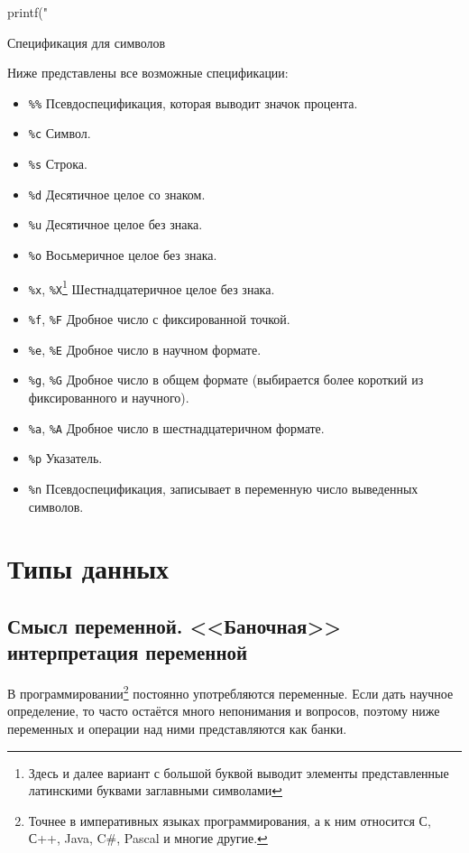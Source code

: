 \documentclass[12pt]{article}
\begin{document}
\begin{listing}[H]
\begin{center}
\begin{ccode}
printf("%
\end{ccode}
\end{center}
\caption{Спецификация для символов}
\label{lst:charspec}
\end{listing}

Ниже представлены все возможные спецификации:
\begin{itemize}
 \item \verb|%%| Псевдоспецификация, которая выводит значок процента.
 \item \verb|%c| Символ.
 \item \verb|%s| Строка.
 \item \verb|%d| Десятичное целое со знаком.
 \item \verb|%u| Десятичное целое без знака.
 \item \verb|%o| Восьмеричное целое без знака.
 \item \verb|%x|, \verb|%X|\footnote{Здесь и далее вариант с большой буквой выводит элементы представленные латинскими буквами заглавными символами} Шестнадцатеричное целое без знака.
 \item \verb|%f|, \verb|%F| Дробное число с фиксированной точкой.
 \item \verb|%e|, \verb|%E| Дробное число в научном формате.
 \item \verb|%g|, \verb|%G| Дробное число в общем формате (выбирается более короткий из фиксированного и научного).
 \item \verb|%a|, \verb|%A| Дробное число в шестнадцатеричном формате.
 \item \verb|%p| Указатель.
 \item \verb|%n| Псевдоспецификация, записывает в переменную число выведенных символов.
\end{itemize}

\section{Типы данных}
\subsection{Смысл переменной. <<Баночная>> интерпретация переменной}
В программировании\footnote{Точнее в императивных языках программирования, а к ним относится С, С++, Java, C\#, Pascal и многие другие.} постоянно употребляются переменные. Если дать научное определение, то часто остаётся много непонимания и вопросов, поэтому ниже переменных и операции над ними представляются как банки.
\end{document}
